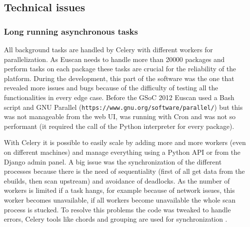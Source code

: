 \subsection{Technical issues}
\subsubsection{Long running asynchronous tasks}
All background tasks are handled by Celery with different workers for parallelization. As Euscan needs to handle more than 20000 packages and perform tasks on each package these tasks are crucial for the reliability of the platform. During the development, this part of the software was the one that revealed more issues and bugs because of the difficulty of testing all the functionalities in every edge case. Before the GSoC 2012 Euscan used a Bash script and GNU Parallel (\texttt{https://www.gnu.org/software/parallel/}) but this was not manageable from the web UI, was running with Cron and was not so performant (it required the call of the Python interpreter for every package).

With Celery it is possible to easily scale by adding more and more workers (even on different machines) and manage everything using a Python API or from the Django admin panel.
A big issue was the synchronization of the different processes because there is the need of sequentiality (first of all get data from the ebuilds, then scan upstream) and avoidance of deadlocks. As the number of workers is limited if a task hangs, for example because of network issues, this worker becomes unavailable, if all workers become unavailable the whole scan process is stucked. To resolve this problems the code was tweaked to handle errors, Celery tools like chords and grouping are used for synchronization \cite{celery_doc}.


